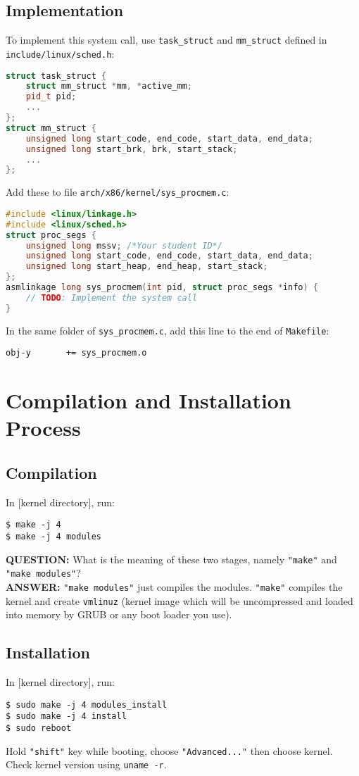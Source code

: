 \documentclass[12pt]{article}
\begin{document}
    \subsection{Implementation}
        To implement this system call, use 
        \texttt{task\_struct} and \texttt{mm\_struct} defined in \texttt{include/linux/sched.h}:
        \begin{lstlisting}[language=C++]
struct task_struct {
    struct mm_struct *mm, *active_mm;
    pid_t pid;
    ...
};
struct mm_struct {
    unsigned long start_code, end_code, start_data, end_data;
    unsigned long start_brk, brk, start_stack;
    ...
};      \end{lstlisting}
        Add these to file \texttt{arch/x86/kernel/sys\_procmem.c}:
        \begin{lstlisting}[language=C++]
#include <linux/linkage.h>
#include <linux/sched.h>
struct proc_segs {
    unsigned long mssv; /*Your student ID*/
    unsigned long start_code, end_code, start_data, end_data;
    unsigned long start_heap, end_heap, start_stack;
};
asmlinkage long sys_procmem(int pid, struct proc_segs *info) {
    // TODO: Implement the system call
}       \end{lstlisting}
        In the same folder of \texttt{sys\_procmem.c}, add this line to the end of \texttt{Makefile}:
        \begin{lstlisting}
obj-y       += sys_procmem.o\end{lstlisting}
    \section{Compilation and Installation Process}
        \subsection{Compilation}
            In [kernel directory], run:
            \begin{lstlisting}
$ make -j 4
$ make -j 4 modules\end{lstlisting}
            \textbf{QUESTION:} What is the meaning of these two stages, namely \texttt{"make"} 
            and \texttt{"make modules"}?\\
            \textbf{ANSWER:} \texttt{"make modules"} just compiles the modules. \texttt{"make"} 
            compiles the kernel and create \texttt{vmlinuz} (kernel image which will be uncompressed and 
            loaded into memory by GRUB or any boot loader you use).
        \subsection{Installation}
            In [kernel directory], run:
            \begin{lstlisting}
$ sudo make -j 4 modules_install
$ sudo make -j 4 install
$ sudo reboot\end{lstlisting}
        Hold \texttt{"shift"} key while booting, choose \texttt{"Advanced..."} then choose kernel.\\
        Check kernel version using \texttt{uname -r}.
\end{document}
